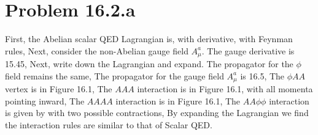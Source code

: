 \documentclass{article}
\begin{document}
\section*{Problem 16.2.a}
First, the Abelian scalar QED Lagrangian is,
with derivative,
with Feynman rules,
Next, consider the non-Abelian gauge field $A_\mu^a$. The gauge derivative is 15.45,
Next, write down the Lagrangian and expand.
The propagator for the $\phi$ field remains the same,
The propagator for the gauge field $A_\mu^a$ is 16.5,
The $\phi A A$ vertex is in Figure 16.1,
The $AAA$ interaction is in Figure 16.1, with all momenta pointing inward,
The $AAAA$ interaction is in Figure 16.1,
The $AA\phi\phi$ interaction is given by  with two possible contractions,
By expanding the Lagrangian we find the interaction rules are similar to that of Scalar QED.
\end{document}
